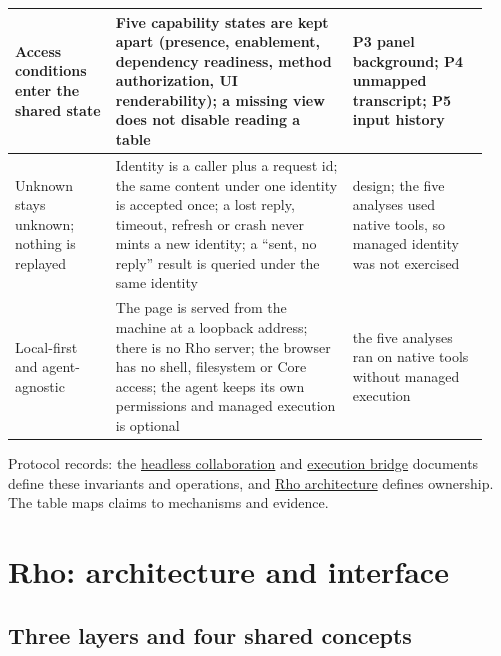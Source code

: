 \documentclass[11pt]{article}
\begin{document}
\begin{table}[H]
\begin{tabular}{@{}>{\raggedright\arraybackslash}p{0.20\linewidth} >{\raggedright\arraybackslash}p{0.47\linewidth} >{\raggedright\arraybackslash}p{0.27\linewidth}@{}}
\hline
Access conditions enter the shared state & Five capability states are kept apart (presence, enablement, dependency readiness, method authorization, UI renderability); a missing view does not disable reading a table & P3 panel background; P4 unmapped transcript; P5 input history \\
\hline
Unknown stays unknown; nothing is replayed & Identity is a caller plus a request id; the same content under one identity is accepted once; a lost reply, timeout, refresh or crash never mints a new identity; a ``sent, no reply'' result is queried under the same identity & design; the five analyses used native tools, so managed identity was not exercised \\
\hline
Local-first and agent-agnostic & The page is served from the machine at a loopback address; there is no Rho server; the browser has no shell, filesystem or Core access; the agent keeps its own permissions and managed execution is optional & the five analyses ran on native tools without managed execution \\
\hline
\end{tabular}
\end{table}

Protocol records: the \href{https://github.com/YuLab-SMU/Rho/blob/main/docs/COLLABORATION.md}{headless collaboration} and \href{https://github.com/YuLab-SMU/Rho/blob/main/docs/EXECUTION.md}{execution bridge} documents define these invariants and operations, and \href{https://github.com/YuLab-SMU/Rho/blob/main/docs/ARCHITECTURE.md}{Rho architecture} defines ownership. The table maps claims to mechanisms and evidence.

\section{Rho: architecture and interface}\label{system}

\subsection{Three layers and four shared concepts}\label{layers}
\end{document}
